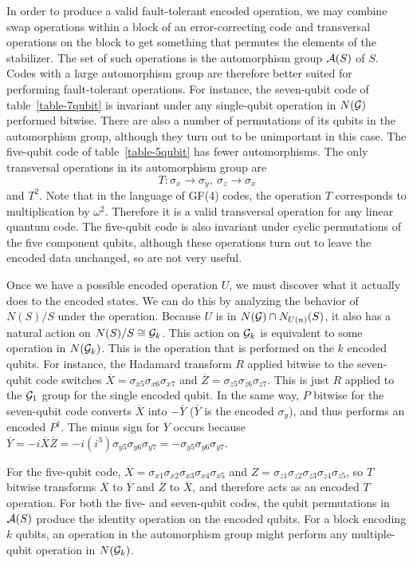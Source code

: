 \documentclass{report}
\newcommand{\G}{{\cal G}}
\newcommand{\X}{\sigma_x}
\newcommand{\Z}{\sigma_z}
\newcommand{\Y}{\sigma_y}
\newcommand{\Xs}[1]{\sigma_{x{#1}}}
\newcommand{\Ys}[1]{\sigma_{y{#1}}}
\newcommand{\Zs}[1]{\sigma_{z{#1}}}
\newcommand{\Xbar}{\overline{X}}
\newcommand{\Ybar}{\overline{Y}}
\newcommand{\Zbar}{\overline{Z}}
\newcommand{\A}{{\cal A}}
\begin{document}
In order to produce a valid fault-tolerant encoded operation, we may 
combine swap operations within a block of an error-correcting code and 
transversal operations on the block to get something that permutes the 
elements of the stabilizer.  The set of such operations is the automorphism 
group $\A (S)$ of $S$.  Codes with a large automorphism group are 
therefore better suited for performing fault-tolerant operations.  For 
instance, the seven-qubit code of table~\ref{table-7qubit} is invariant 
under any single-qubit operation in $N(\G)$ performed bitwise.  There are 
also a number of permutations of its qubits in the automorphism group, 
although they turn out to be unimportant in this case.  The five-qubit code 
of table~\ref{table-5qubit} has fewer automorphisms.  The only 
transversal operations in its automorphism group are
\begin{equation}
T: \X \rightarrow \Y, \ \Z \rightarrow \X
\end{equation}
and $T^2$.  Note that in the language of GF(4) codes, the operation $T$ 
corresponds to multiplication by $\omega^2$.  Therefore it is a valid 
transversal operation for any linear quantum code.  The five-qubit code is 
also invariant under cyclic permutations of the five component qubits, 
although these operations turn out to leave the encoded data unchanged, 
so are not very useful.

Once we have a possible encoded operation $U$, we must discover what it 
actually does to the encoded states.  We can do this by analyzing the 
behavior of $N(S)/S$ under the operation.  Because $U$ is in $N(\G) \cap
N_{U(n)} (S)$, it also has a natural action on $N(S)/S \cong \G_k$.  This 
action on $\G_k$ is equivalent to some operation in $N(\G_k)$.  This is the 
operation that is performed on the $k$ encoded qubits.  For instance, the 
Hadamard transform $R$ applied bitwise to the seven-qubit code switches $\Xbar 
= \Xs{5} \Xs{6} \Xs{7}$ and $\Zbar = \Zs{5} \Zs{6} \Zs{7}$.  This is just $R$ 
applied to the $\G_1$ group for the single encoded qubit.  In the same way, $P$ 
bitwise for the seven-qubit code converts $\Xbar$ into $-\Ybar$ ($\Ybar$ is the 
encoded $\Y$), and thus performs an encoded $P^\dagger$.  The minus sign
for $\Ybar$ occurs because $\Ybar = -i \Xbar \Zbar = -i (i^3) \Ys{5} \Ys{6}
\Ys{7} = - \Ys{5} \Ys{6} \Ys{7}$.

For the five-qubit code, 
$\Xbar = \Xs{1} \Xs{2} \Xs{3} \Xs{4} \Xs{5}$ and $\Zbar = \Zs{1} \Zs{2} \Zs{3} 
\Zs{4} \Zs{5}$, so $T$ bitwise transforms $\Xbar$ to $\Ybar$ and $\Zbar$ to 
$\Xbar$, and therefore acts as an encoded $T$ operation.  For both the 
five- and seven-qubit codes, the qubit permutations in $\A(S)$ produce 
the identity operation on the encoded qubits.  For a block encoding $k$ 
qubits, an operation in the automorphism group might perform any 
multiple-qubit operation in $N(\G_k)$.
\end{document}
